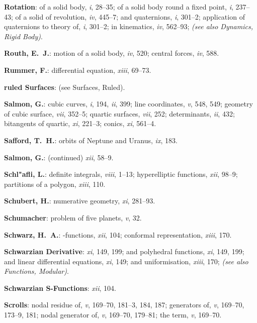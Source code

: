 \documentclass[11pt,a4paper]{article}
\newcommand{\IndexEntry}[1]{\textbf{#1}}
\newcommand{\SeeAlso}[1]{\textit{(see also #1)}}
\newcommand{\V}[1]{\textit{#1}} %
\begin{document}
\IndexEntry{Rotation}: of a solid body, \V{i}, 28--35; of a solid body round a fixed point, \V{i}, 237--43; of a solid of revolution, \V{iv}, 445--7; and quaternions, \V{i}, 301--2; application of quaternions to theory of, \V{i}, 301--2; in kinematics, \V{iv}, 562--93; \SeeAlso{Dynamics, Rigid Body}.

\IndexEntry{Routh, E.\ J.}: motion of a solid body, \V{iv}, 520; central forces, \V{iv}, 588.

\IndexEntry{Rummer, F.}: differential equation, \V{xiii}, 69--73.

\IndexEntry{ ruled Surfaces}: (see Surfaces, Ruled).

\IndexEntry{Salmon, G.}: cubic curves, \V{i}, 194, \V{ii}, 399; line coordinates, \V{v}, 548, 549; geometry of cubic surface, \V{vii}, 352--5; quartic surfaces, \V{vii}, 252; determinants, \V{ii}, 432; bitangents of quartic, \V{xi}, 221--3; conics, \V{xi}, 561--4.

\newpage

\setcounter{page}{122}

\IndexEntry{Safford, T.\ H.}: orbits of Neptune and Uranus, \V{ix}, 183.

\IndexEntry{Salmon, G.}: (continued) \V{xii}, 58--9.

\IndexEntry{Schl"afli, L.}: definite integrals, \V{viii}, 1--13; hyperelliptic functions, \V{xii}, 98--9; partitions of a polygon, \V{xiii}, 110.

\IndexEntry{Schubert, H.}: numerative geometry, \V{xi}, 281--93.

\IndexEntry{Schumacher}: problem of five planets, \V{v}, 32.

\IndexEntry{Schwarz, H.\ A.}: \vartheta-functions, \V{xii}, 104; conformal representation, \V{xiii}, 170.

\IndexEntry{Schwarzian Derivative}: \V{xi}, 149, 199; and polyhedral functions, \V{xi}, 149, 199; and linear differential equations, \V{xi}, 149; and uniformisation, \V{xiii}, 170; \SeeAlso{Functions, Modular}.

\IndexEntry{Schwarzian S-Functions}: \V{xii}, 104.

\IndexEntry{Scrolls}: nodal residue of, \V{v}, 169--70, 181--3, 184, 187; generators of, \V{v}, 169--70, 173--9, 181; nodal generator of, \V{v}, 169--70, 179--81; the term, \V{v}, 169--70.
\end{document}
